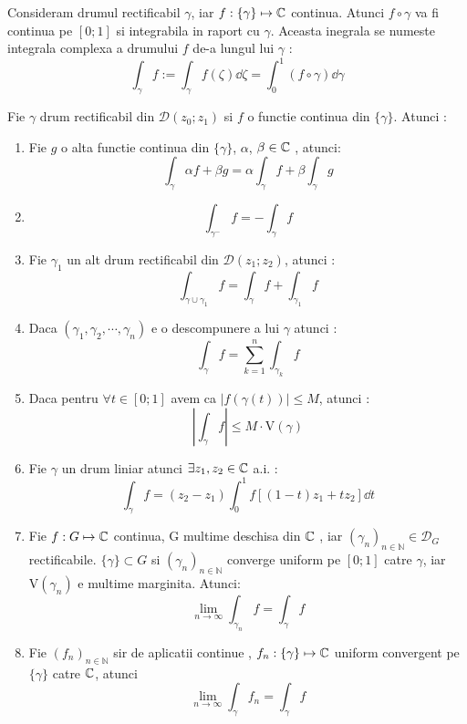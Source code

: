 \begin{definition}
    Consideram drumul rectificabil $\gamma$, iar $f:\{\gamma\} \mapsto \mathbb{C}$ continua.
    Atunci $f \circ \gamma$ va fi continua pe $[0;1]$ si integrabila in raport cu $\gamma$.
    Aceasta inegrala se numeste integrala complexa a drumului $f$ de-a lungul lui $\gamma$ :
    \begin{equation*}
        \int_{\gamma} f := \int_{\gamma} f(\zeta) \dd \zeta = \int_0^1 (f \circ \gamma) \dd \gamma
    \end{equation*}
\end{definition}

\begin{theorem}
    Fie $\gamma$ drum rectificabil din $\mathcal{D}(z_0;z_1)$ si $f$ o functie continua din $\{\gamma\}$. Atunci :
    \begin{enumerate}
        \item Fie $g$ o alta functie continua din $\{\gamma\}$, $\alpha$, $\beta \in \mathbb{C}$
            , atunci:
            \[
                \int_{\gamma} \alpha f + \beta g  = \alpha \int_{\gamma} f + \beta \int_{\gamma} g
            \]
        \item
            \[
                \int_{\gamma^{-}} f = -\int_{\gamma} f
            \]
        \item Fie $\gamma_1$ un alt drum rectificabil din $\mathcal{D}(z_1;z_2)$, atunci :
            \[
                \int_{\gamma \cup \gamma_1} f = \int_{\gamma} f + \int_{\gamma_1} f
            \]
        \item Daca $(\gamma_1, \gamma_2, \cdots, \gamma_n)$ e o descompunere a lui $\gamma$ atunci :
            \[
                \int_{\gamma} f = \sum_{k=1}^{n} \int_{\gamma_k} f
            \]
        \item Daca pentru $\forall t \in [0;1]$ avem ca $|f(\gamma(t))| \leq M$, atunci :
            \[
                \left | \int_{\gamma} f \right | \leq M \cdot \mathrm{V}(\gamma)
            \]
        \item Fie $\gamma$ un drum liniar atunci $\exists z_1, z_2 \in \mathbb{C}$ a.i. :
            \[
                 \int_{\gamma} f = (z_2 -z_1) \int_0^1 f[(1-t)z_1 + tz_2] \dd t
            \]
        \item Fie $f:G\mapsto \mathbb{C}$ continua, G multime deschisa din $\mathbb{C}$ ,
            iar $(\gamma_n)_{n\in\mathbb{N}} \in \mathcal{D}_G$ rectificabile.
            $\{\gamma\} \subset G$ si $(\gamma_n)_{n\in\mathbb{N}}$ converge uniform pe $[0;1]$ catre $\gamma$, iar
            $\mathrm{V}(\gamma_n)$ e multime marginita. Atunci:
            \[
                \lim_{n\to \infty} \int_{\gamma_n} f = \int_{\gamma} f
            \]
        \item Fie $(f_n)_{n\in\mathbb{N}}$ sir de aplicatii continue ,
            $f_n : \{\gamma\} \mapsto \mathbb{C}$ uniform convergent pe $\{\gamma\}$ catre $\mathbb{C}$, atunci
            \[
                \lim_{n\to\infty} \int_{\gamma} f_n = \int_{\gamma} f
            \]
    \end{enumerate}
\end{theorem}


